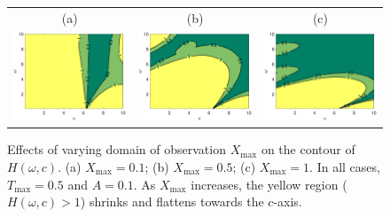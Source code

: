 \documentclass[a4paper,11pt]{article}
\theoremstyle{definition}
\begin{document}
%
\begin{figure}
\centering
\begin{tabular}{ccc}
(a)&(b)&(c)\\
\includegraphics[width=2in]{Figures/MIPcontour1.eps}&
\includegraphics[width=2in]{Figures/MIPcontour2.eps}&
\includegraphics[width=2in]{Figures/MIPcontour3.eps}
\end{tabular}
\caption{Effects of varying domain of observation $X_{\max}$ on the contour of $H(\omega,c)$. (a) $X_{\max}=0.1$; (b) $X_{\max}=0.5$; (c) $X_{\max}=1$.  In all cases, $T_{\max}=0.5$ and $A=0.1$. As $X_{\max}$ increases, the yellow region ($H(\omega,c)>1$) shrinks and flattens towards the $c$-axis.}\label{fig.MIPtest1}
\end{figure}
\end{document}
